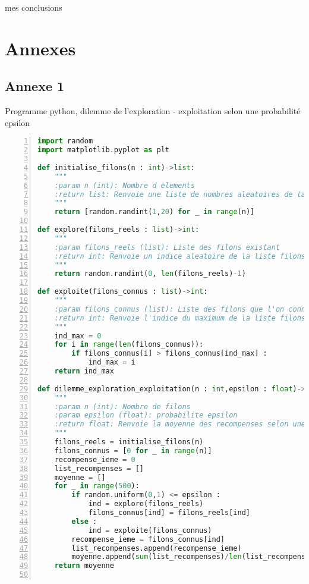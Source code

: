 \documentclass[
12pt,
french,
]{article}
\begin{document}
mes conclusions

\hypertarget{annexes}{%
\section{Annexes}\label{annexes}}

\hypertarget{annexe-1}{%
\subsection{Annexe 1}\label{annexe-1}}

Programme python, dilemme de l'exploration - exploitation selon une
probabilité epsilon

\begin{lstlisting}[language=Python, numbers=left, label=dilemme_exploration_exploitation]
import random
import matplotlib.pyplot as plt

def initialise_filons(n : int)->list:
    """
    :param n (int): Nombre d elements
    :return list: Renvoie une liste de nombres aleatoires de taille n
    """
    return [random.randint(1,20) for _ in range(n)]

def explore(filons_reels : list)->int:
    """
    :param filons_reels (list): Liste des filons existant
    :return int: Renvoie un indice aleatoire de la liste filons_reels
    """
    return random.randint(0, len(filons_reels)-1)

def exploite(filons_connus : list)->int:
    """
    :param filons_connus (list): Liste des filons que l'on connait
    :return int: Renvoie l'indice du maximum de la liste filons_connus
    """
    ind_max = 0
    for i in range(len(filons_connus)):
        if filons_connus[i] > filons_connus[ind_max] :
            ind_max = i
    return ind_max

def dilemme_exploration_exploitation(n : int,epsilon : float)->float:
    """
    :param n (int): Nombre de filons
    :param epsilon (float): probabilite epsilon
    :return float: Renvoie la moyenne des recompenses selon une probabilite epsilon d'explorer ou d'exploiter
    """
    filons_reels = initialise_filons(n)
    filons_connus = [0 for _ in range(n)]
    recompense_ieme = 0
    list_recompenses = []
    moyenne = []
    for _ in range(500):
        if random.uniform(0,1) <= epsilon :
            ind = explore(filons_reels)
            filons_connus[ind] = filons_reels[ind]
        else :
            ind = exploite(filons_connus)
        recompense_ieme = filons_connus[ind]
        list_recompenses.append(recompense_ieme)
        moyenne.append(sum(list_recompenses)/len(list_recompenses))
    return moyenne


\end{lstlisting}
\end{document}
